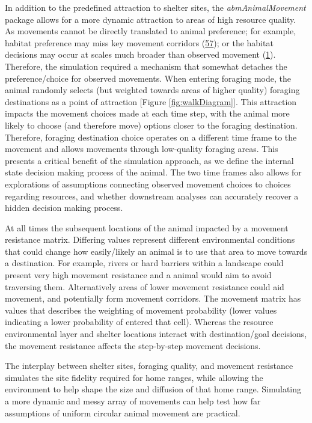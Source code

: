 \documentclass[10pt,a4paper]{article}
\begin{document}
In addition to the predefined attraction to shelter sites, the \emph{abmAnimalMovement} package allows for a more dynamic attraction to areas of high resource quality.
As movements cannot be directly translated to animal preference; for example, habitat preference may miss key movement corridors (\protect\hyperlink{ref-Scharf2018}{57}); or the habitat decisions may occur at scales much broader than observed movement (\protect\hyperlink{ref-Bastille-Rousseau2017}{1}).
Therefore, the simulation required a mechanism that somewhat detaches the preference/choice for observed movements.
When entering foraging mode, the animal randomly selects (but weighted towards areas of higher quality) foraging destinations as a point of attraction {[}Figure \ref{fig:walkDiagram}{]}.
This attraction impacts the movement choices made at each time step, with the animal more likely to choose (and therefore move) options closer to the foraging destination.
Therefore, foraging destination choice operates on a different time frame to the movement and allows movements through low-quality foraging areas.
This presents a critical benefit of the simulation approach, as we define the internal state decision making process of the animal.
The two time frames also allows for explorations of assumptions connecting observed movement choices to choices regarding resources, and whether downstream analyses can accurately recover a hidden decision making process.

At all times the subsequent locations of the animal impacted by a movement resistance matrix.
Differing values represent different environmental conditions that could change how easily/likely an animal is to use that area to move towards a destination.
For example, rivers or hard barriers within a landscape could present very high movement resistance and a animal would aim to avoid traversing them.
Alternatively areas of lower movement resistance could aid movement, and potentially form movement corridors.
The movement matrix has values that describes the weighting of movement probability (lower values indicating a lower probability of entered that cell).
Whereas the resource environmental layer and shelter locations interact with destination/goal decisions, the movement resistance affects the step-by-step movement decisions.

The interplay between shelter sites, foraging quality, and movement resistance simulates the site fidelity required for home ranges, while allowing the environment to help shape the size and diffusion of that home range.
Simulating a more dynamic and messy array of movements can help test how far assumptions of uniform circular animal movement are practical.
\end{document}

